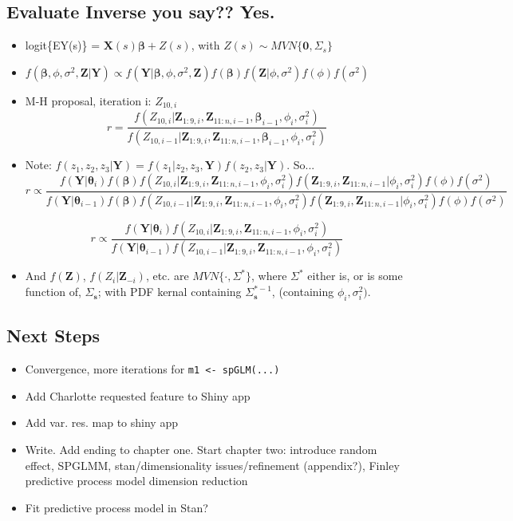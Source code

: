 \documentclass{article}
\begin{document}
\subsection*{Evaluate Inverse you say?? Yes.}
\begin{itemize}
\item logit\{EY(s)\} = $\pmb{X}(s)\pmb{\beta} + Z(s)$, with $Z(s) \sim MVN\{\pmb{0}, \Sigma_{s}\}$
\item $f(\pmb{\beta}, \phi, \sigma^{2}, \pmb{Z}|\pmb{Y}) \propto f(\pmb{Y}|\pmb{\beta}, \phi, \sigma^{2}, \pmb{Z})f(\pmb{\beta})f(\pmb{Z}|\phi, \sigma^{2})f(\phi)f(\sigma^{2})$
\item M-H proposal, iteration i: $Z_{10,i}$
$$ r = \frac{ f(Z_{10,i}|\pmb{Z}_{1:9,i},\pmb{Z}_{11:n,i-1}, \pmb{\beta}_{i-1}, \phi_{i}, \sigma^{2}_{i})}{f(Z_{10,i-1}|\pmb{Z}_{1:9,i},\pmb{Z}_{11:n,i-1}, \pmb{\beta}_{i-1}, \phi_{i}, \sigma^{2}_{i})} $$
 
\item Note: $f(z_{1}, z_{2}, z_{3}|\pmb{Y}) = f(z_{1}|z_{2},z_{3},\pmb{Y})f(z_{2},z_{3}|\pmb{Y})$. So... $$r \propto \frac{f(\pmb{Y}|\pmb{\theta}_{i})f(\pmb{\beta})f(Z_{10,i}|\pmb{Z}_{1:9,i},\pmb{Z}_{11:n,i-1}, \phi_{i}, \sigma^{2}_{i})f(\pmb{Z}_{1:9,i},\pmb{Z}_{11:n,i-1}|\phi_{i}, \sigma^{2}_{i})f(\phi)f(\sigma^{2})} {f(\pmb{Y}|\pmb{\theta}_{i-1})f(\pmb{\beta})f(Z_{10,i-1}|\pmb{Z}_{1:9,i},\pmb{Z}_{11:n,i-1}, \phi_{i}, \sigma^{2}_{i})f(\pmb{Z}_{1:9,i},\pmb{Z}_{11:n,i-1}|\phi_{i}, \sigma^{2}_{i})f(\phi)f(\sigma^{2})}$$

$$ r \propto \frac{f(\pmb{Y}|\pmb{\theta}_{i})f(Z_{10,i}|\pmb{Z}_{1:9,i},\pmb{Z}_{11:n,i-1}, \phi_{i}, \sigma^{2}_{i})}
{f(\pmb{Y}|\pmb{\theta}_{i-1})f(Z_{10,i-1}|\pmb{Z}_{1:9,i},\pmb{Z}_{11:n,i-1}, \phi_{i}, \sigma^{2}_{i})} $$

\item And $f(\pmb{Z})$, $f(Z_{i}|\pmb{Z}_{-i})$, etc. are $MVN\{\cdot,\Sigma^{*}\}$, where $\Sigma^{*}$ either is, or is some function of, $\Sigma_{\pmb{s}}$; with PDF kernal containing $\Sigma_{\pmb{s}}^{*-1}$, (containing $\phi_{i}, \sigma^{2}_{i})$.

\end{itemize}

\subsection*{Next Steps}
\begin{itemize}
\item Convergence, more iterations for \verb|m1 <- spGLM(...)|
\item Add Charlotte requested feature to Shiny app
\item Add var. res. map to shiny app
\item Write. Add ending to chapter one. Start chapter two: introduce random effect, SPGLMM, stan/dimensionality issues/refinement (appendix?), Finley predictive process model dimension reduction
\item Fit predictive process model in Stan?
\end{itemize}
\end{document}

